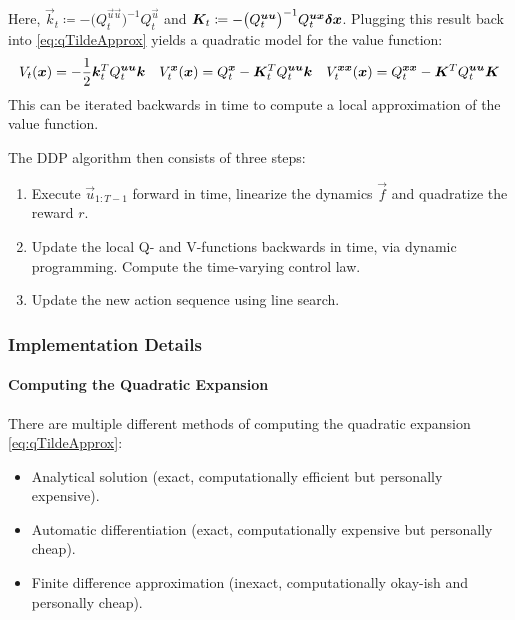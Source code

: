 			Here, \( \vec{k}_t \coloneqq -\big(Q_t^{\vec{u} \vec{u}}\big)^{-1} Q_t^{\vec{u}} \) and \( \bm{K}_t \coloneqq -\big(Q_t^{\bm{u} \bm{u}}\big)^{-1} Q_t^{\bm{u} \bm{x}} \bm{\delta x} \). Plugging this result back into \eqref{eq:qTildeApprox} yields a quadratic model for the value function:
			\begin{align*}
				V_t(\bm{x}) = -\frac{1}{2} \bm{k}_t^T Q_t^{\bm{u} \bm{u}} \bm{k}
				 &  &
				V_t^{\bm{x}}(\bm{x}) = Q_t^{\bm{x}} - \bm{K}_t^T Q_t^{\bm{u} \bm{u}} \bm{k}
				 &  &
				V_t^{\bm{x} \bm{x}}(\bm{x}) = Q_t^{\bm{x} \bm{x}} - \bm{K}^T Q_t^{\bm{u} \bm{u}} \bm{K}
			\end{align*}
			This can be iterated backwards in time to compute a local approximation of the value function.

			The DDP algorithm then consists of three steps:
			\begin{enumerate}
				\item Execute \( \vec{u}_{1:T - 1} \) forward in time, linearize the dynamics \(\vec{f}\) and quadratize the reward \(r\).
				\item Update the local Q- and V-functions backwards in time, via dynamic programming. Compute the time-varying control law.
				\item Update the new action sequence using line search.
			\end{enumerate}

			\subsubsection{Implementation Details}
				\paragraph{Computing the Quadratic Expansion}
					There are multiple different methods of computing the quadratic expansion \eqref{eq:qTildeApprox}:
					\begin{itemize}
						\item Analytical solution (exact, computationally efficient but personally expensive).
						\item Automatic differentiation (exact, computationally expensive but personally cheap).
						\item Finite difference approximation (inexact, computationally okay-ish and personally cheap).
					\end{itemize}

